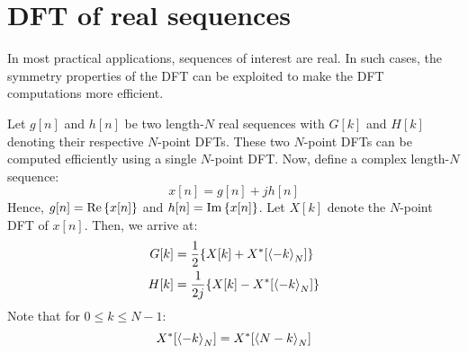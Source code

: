 \documentclass[../../main/main.tex]{subfiles}
\begin{document}

\section{DFT of real sequences}
In most practical applications, sequences of interest are real. In such cases, the symmetry properties of the DFT can be exploited to make the DFT computations more efficient.

Let \( g[n] \) and \( h[n] \) be two length-\( N \) real sequences with \( G[k] \) and \( H[k] \) denoting their respective \( N \)-point DFTs. These two \( N \)-point DFTs can be computed efficiently using a single \( N \)-point DFT. Now, define a complex length-\( N \) sequence:
\begin{equation}
    x[n]
    =
    g[n] + jh[n]
    \label{eq:L13_S04_1}
\end{equation}
Hence, \( g[n] = \operatorname{Re}\qty{x[n]} \) and \( h[n] = \operatorname{Im}\qty{x[n]} \). Let \( X[k] \) denote the \( N \)-point DFT of \( x[n] \). Then, we arrive at:
\begin{align}
    G[k] &= \frac{1}{2} \qty{X[k] + X^{*}[\expval{-k}_{N}]} \\
    H[k] &= \frac{1}{2j} \qty{X[k] - X^{*}[\expval{-k}_{N}]}
\end{align}
Note that for \( 0 \le k \le N-1 \):
\begin{equation}
    X^{*}[\expval{-k}_{N}]
    =
    X^{*}[\expval{N-k}_{N}]
    \label{eq:L13_S05_3}
\end{equation}
\end{document}
